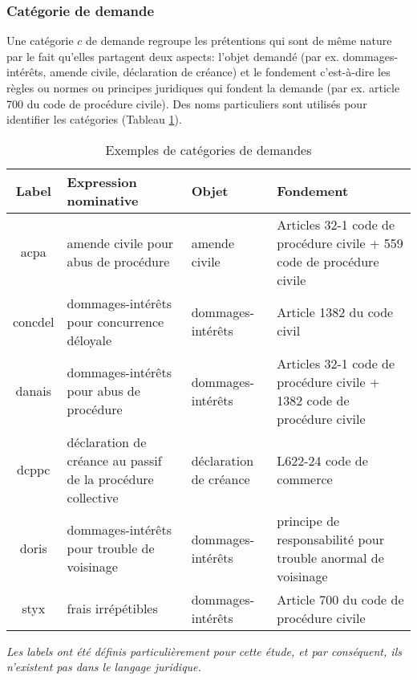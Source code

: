 \subsubsection{Catégorie de demande}

Une catégorie $c$ de demande regroupe les prétentions qui sont de même nature par le fait qu'elles partagent deux aspects: l'objet demandé (par ex. dommages-intérêts, amende civile, déclaration de créance) et le fondement c'est-à-dire les règles ou normes ou principes juridiques qui fondent la demande (par ex. article 700 du code de procédure civile). Des noms particuliers sont utilisés pour identifier les catégories (Tableau \ref{tab:quanta:exemple-categorie}).

\begin{table}[!htb]
\scriptsize
\begin{tabular}{|c|p{}|p{}|p{}|}
\hline
\textbf{Label} & \textbf{Expression nominative }                                     & \textbf{Objet}                                                       & \textbf{Fondement}                                                                 \\ \hline
acpa & amende civile pour abus de procédure                         & amende civile                                               & Articles 32-1 code de procédure civile + 559 code de procédure civile  \\ \hline
concdel & dommages-intérêts pour concurrence déloyale                  & dommages-intérêts                                           & Article 1382 du code civil                                             \\ \hline
danais & dommages-intérêts pour abus de procédure                   & dommages-intérêts                                           & Articles 32-1 code de procédure civile + 1382 code de procédure civile \\ \hline
dcppc & déclaration de créance au passif de la procédure collective  & déclaration de créance & L622-24 code de commerce                                               \\ \hline
doris & dommages-intérêts pour trouble de voisinage                  & dommages-intérêts                                           & principe de responsabilité pour trouble anormal de voisinage           \\ \hline
styx & frais irrépétibles                                          & dommages-intérêts                                           & Article 700 du code de procédure civile                                 \\ \hline
\end{tabular}
\textit{Les labels ont été définis particulièrement pour cette étude, et par conséquent, ils n'existent pas dans le langage juridique.}
\caption{Exemples de catégories de demandes}\label{tab:quanta:exemple-categorie}
\end{table}

